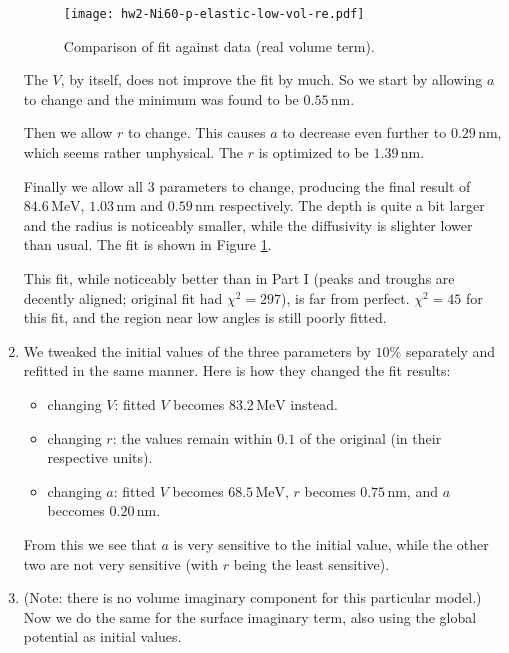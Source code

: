 \documentclass[fleqn, 12pt]{article}
\begin{document}
\begin{enumerate}
  \begin{figure}
    \centering
    \texttt{[image: hw2-Ni60-p-elastic-low-vol-re.pdf]}
    \caption{Comparison of fit against data (real volume term).}
    \label{fig:low-vol-re}
  \end{figure}

  The $V$, by itself, does not improve the fit by much.  So we start by
  allowing $a$ to change and the minimum was found to be $0.55\,\mathrm{nm}$.

  Then we allow $r$ to change.  This causes $a$ to decrease even further to
  $0.29\,\mathrm{nm}$, which seems rather unphysical.  The $r$ is optimized to
  be $1.39\,\mathrm{nm}$.

  Finally we allow all 3 parameters to change, producing the final result of
  $84.6\,\mathrm{MeV}$, $1.03\,\mathrm{nm}$ and $0.59\,\mathrm{nm}$
  respectively.  The depth is quite a bit larger and the radius is noticeably
  smaller, while the diffusivity is slighter lower than usual.  The fit is
  shown in Figure \ref{fig:low-vol-re}.

  This fit, while noticeably better than in Part I (peaks and troughs are
  decently aligned; original fit had $\chi^2 = 297$), is far from perfect.
  $\chi^2 = 45$ for this fit, and the region near low angles is still poorly
  fitted.

\item We tweaked the initial values of the three parameters by $10\%$
  separately and refitted in the same manner.  Here is how they changed the
  fit results:
  \begin{itemize}
  \item changing $V$: fitted $V$ becomes $83.2\,\mathrm{MeV}$ instead.
  \item changing $r$: the values remain within $0.1$ of the original (in their
    respective units).
  \item changing $a$: fitted $V$ becomes $68.5\,\mathrm{MeV}$, $r$ becomes
    $0.75\,\mathrm{nm}$, and $a$ beccomes $0.20\,\mathrm{nm}$.
  \end{itemize}
  From this we see that $a$ is very sensitive to the initial value, while the
  other two are not very sensitive (with $r$ being the least sensitive).

\item (Note: there is no volume imaginary component for this particular
  model.)  Now we do the same for the surface imaginary term, also using the
  global potential as initial values.


\end{enumerate}
\end{document}
